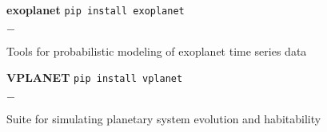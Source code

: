 \documentclass[]{luger-cv} %
\begin{document}
\begin{entrylist}

    \entry
    {\textbf{exoplanet}}
    {\textnormal{\texttt{pip install exoplanet}}}
    {}
    {%
        \vspace{-1em}
        \begin{list}{{\color{numcolor}$-$}}{\cvlist}
            \item Tools for probabilistic modeling of exoplanet time series data
        \end{list}
    }


    \entry
    {\textbf{VPLANET}}
    {\textnormal{\texttt{pip install vplanet}}}
    {}
    {%
        \vspace{-1em}
        \begin{list}{{\color{numcolor}$-$}}{\cvlist}
            \item Suite for simulating planetary system evolution and habitability
        \end{list}
    }


\end{entrylist}

\end{document}

